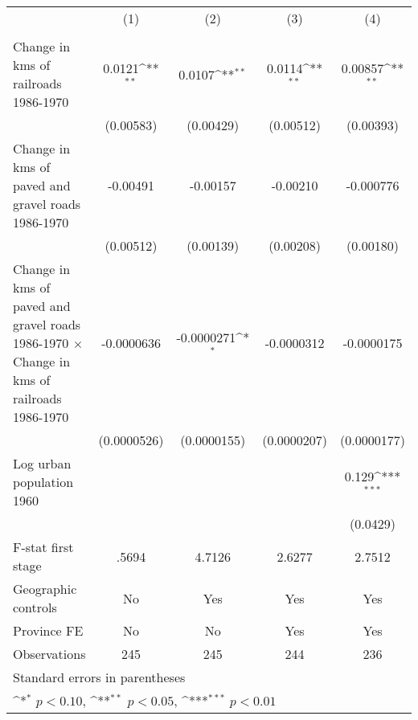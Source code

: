 {
\def\sym#1{\ifmmode^{#1}\else\(^{#1}\)\fi}
\begin{tabular}{l*{4}{c}}
\hline\hline
                &\multicolumn{1}{c}{(1)}&\multicolumn{1}{c}{(2)}&\multicolumn{1}{c}{(3)}&\multicolumn{1}{c}{(4)}\\
                &\multicolumn{1}{c}{}&\multicolumn{1}{c}{}&\multicolumn{1}{c}{}&\multicolumn{1}{c}{}\\
\hline
Change in kms of railroads 1986-1970&   0.0121\sym{**} &   0.0107\sym{**} &   0.0114\sym{**} &  0.00857\sym{**} \\
                &(0.00583)         &(0.00429)         &(0.00512)         &(0.00393)         \\
[1em]
Change in kms of paved and gravel roads 1986-1970& -0.00491         & -0.00157         & -0.00210         &-0.000776         \\
                &(0.00512)         &(0.00139)         &(0.00208)         &(0.00180)         \\
[1em]
Change in kms of paved and gravel roads 1986-1970 $\times$ Change in kms of railroads 1986-1970&-0.0000636         &-0.0000271\sym{*}  &-0.0000312         &-0.0000175         \\
                &(0.0000526)         &(0.0000155)         &(0.0000207)         &(0.0000177)         \\
[1em]
Log urban population 1960&                  &                  &                  &    0.129\sym{***}\\
                &                  &                  &                  & (0.0429)         \\
\hline
F-stat first stage&    .5694         &   4.7126         &   2.6277         &   2.7512         \\
Geographic controls&       No         &      Yes         &      Yes         &      Yes         \\
Province FE     &       No         &       No         &      Yes         &      Yes         \\
Observations    &      245         &      245         &      244         &      236         \\
\hline\hline
\multicolumn{5}{l}{\footnotesize Standard errors in parentheses}\\
\multicolumn{5}{l}{\footnotesize \sym{*} \(p<0.10\), \sym{**} \(p<0.05\), \sym{***} \(p<0.01\)}\\
\end{tabular}
}
